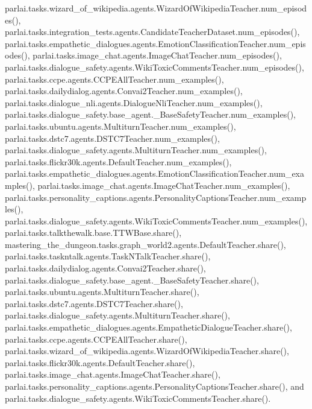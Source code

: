 parlai.\+tasks.\+wizard\+\_\+of\+\_\+wikipedia.\+agents.\+Wizard\+Of\+Wikipedia\+Teacher.\+num\+\_\+episodes(), parlai.\+tasks.\+integration\+\_\+tests.\+agents.\+Candidate\+Teacher\+Dataset.\+num\+\_\+episodes(), parlai.\+tasks.\+empathetic\+\_\+dialogues.\+agents.\+Emotion\+Classification\+Teacher.\+num\+\_\+episodes(), parlai.\+tasks.\+image\+\_\+chat.\+agents.\+Image\+Chat\+Teacher.\+num\+\_\+episodes(), parlai.\+tasks.\+dialogue\+\_\+safety.\+agents.\+Wiki\+Toxic\+Comments\+Teacher.\+num\+\_\+episodes(), parlai.\+tasks.\+ccpe.\+agents.\+C\+C\+P\+E\+All\+Teacher.\+num\+\_\+examples(), parlai.\+tasks.\+dailydialog.\+agents.\+Convai2\+Teacher.\+num\+\_\+examples(), parlai.\+tasks.\+dialogue\+\_\+nli.\+agents.\+Dialogue\+Nli\+Teacher.\+num\+\_\+examples(), parlai.\+tasks.\+dialogue\+\_\+safety.\+base\+\_\+agent.\+\_\+\+Base\+Safety\+Teacher.\+num\+\_\+examples(), parlai.\+tasks.\+ubuntu.\+agents.\+Multiturn\+Teacher.\+num\+\_\+examples(), parlai.\+tasks.\+dstc7.\+agents.\+D\+S\+T\+C7\+Teacher.\+num\+\_\+examples(), parlai.\+tasks.\+dialogue\+\_\+safety.\+agents.\+Multiturn\+Teacher.\+num\+\_\+examples(), parlai.\+tasks.\+flickr30k.\+agents.\+Default\+Teacher.\+num\+\_\+examples(), parlai.\+tasks.\+empathetic\+\_\+dialogues.\+agents.\+Emotion\+Classification\+Teacher.\+num\+\_\+examples(), parlai.\+tasks.\+image\+\_\+chat.\+agents.\+Image\+Chat\+Teacher.\+num\+\_\+examples(), parlai.\+tasks.\+personality\+\_\+captions.\+agents.\+Personality\+Captions\+Teacher.\+num\+\_\+examples(), parlai.\+tasks.\+dialogue\+\_\+safety.\+agents.\+Wiki\+Toxic\+Comments\+Teacher.\+num\+\_\+examples(), parlai.\+tasks.\+talkthewalk.\+base.\+T\+T\+W\+Base.\+share(), mastering\+\_\+the\+\_\+dungeon.\+tasks.\+graph\+\_\+world2.\+agents.\+Default\+Teacher.\+share(), parlai.\+tasks.\+taskntalk.\+agents.\+Task\+N\+Talk\+Teacher.\+share(), parlai.\+tasks.\+dailydialog.\+agents.\+Convai2\+Teacher.\+share(), parlai.\+tasks.\+dialogue\+\_\+safety.\+base\+\_\+agent.\+\_\+\+Base\+Safety\+Teacher.\+share(), parlai.\+tasks.\+ubuntu.\+agents.\+Multiturn\+Teacher.\+share(), parlai.\+tasks.\+dstc7.\+agents.\+D\+S\+T\+C7\+Teacher.\+share(), parlai.\+tasks.\+dialogue\+\_\+safety.\+agents.\+Multiturn\+Teacher.\+share(), parlai.\+tasks.\+empathetic\+\_\+dialogues.\+agents.\+Empathetic\+Dialogue\+Teacher.\+share(), parlai.\+tasks.\+ccpe.\+agents.\+C\+C\+P\+E\+All\+Teacher.\+share(), parlai.\+tasks.\+wizard\+\_\+of\+\_\+wikipedia.\+agents.\+Wizard\+Of\+Wikipedia\+Teacher.\+share(), parlai.\+tasks.\+flickr30k.\+agents.\+Default\+Teacher.\+share(), parlai.\+tasks.\+image\+\_\+chat.\+agents.\+Image\+Chat\+Teacher.\+share(), parlai.\+tasks.\+personality\+\_\+captions.\+agents.\+Personality\+Captions\+Teacher.\+share(), and parlai.\+tasks.\+dialogue\+\_\+safety.\+agents.\+Wiki\+Toxic\+Comments\+Teacher.\+share().

